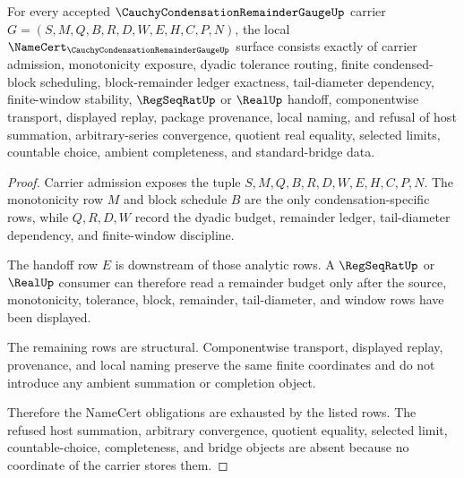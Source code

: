 \begin{theorem}
\label{thm:cauchy-condensation-remainder-gauge-namecert-obligations}
For every accepted $\CauchyCondensationRemainderGaugeUp$ carrier $G=(S,M,Q,B,R,D,W,E,H,C,P,N)$, the local $\NameCert_{\CauchyCondensationRemainderGaugeUp}$ surface consists exactly of carrier admission, monotonicity exposure, dyadic tolerance routing, finite condensed-block scheduling, block-remainder ledger exactness, tail-diameter dependency, finite-window stability, $\RegSeqRatUp$ or $\RealUp$ handoff, componentwise transport, displayed replay, package provenance, local naming, and refusal of host summation, arbitrary-series convergence, quotient real equality, selected limits, countable choice, ambient completeness, and standard-bridge data.
\end{theorem}
\begin{proof}
Carrier admission exposes the tuple $S,M,Q,B,R,D,W,E,H,C,P,N$. The monotonicity row $M$ and block schedule $B$ are the only condensation-specific rows, while $Q,R,D,W$ record the dyadic budget, remainder ledger, tail-diameter dependency, and finite-window discipline.

The handoff row $E$ is downstream of those analytic rows. A $\RegSeqRatUp$ or $\RealUp$ consumer can therefore read a remainder budget only after the source, monotonicity, tolerance, block, remainder, tail-diameter, and window rows have been displayed.

The remaining rows are structural. Componentwise transport, displayed replay, provenance, and local naming preserve the same finite coordinates and do not introduce any ambient summation or completion object.

Therefore the NameCert obligations are exhausted by the listed rows. The refused host summation, arbitrary convergence, quotient equality, selected limit, countable-choice, completeness, and bridge objects are absent because no coordinate of the carrier stores them.
\end{proof}

